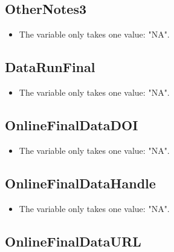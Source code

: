 \documentclass[]{article}
\providecommand{\tightlist}{%
  \setlength{\itemsep}{0pt}\setlength{\parskip}{0pt}}
\newcommand{\fullline}{\noindent\makebox[\linewidth]{\rule{\textwidth}{0.4pt}}}
\begin{document}
\fullline

\hypertarget{othernotes3}{\subsection{OtherNotes3}\label{othernotes3}}

\begin{itemize}
\tightlist
\item
  The variable only takes one value: "NA".
\end{itemize}

\fullline

\hypertarget{datarunfinal}{\subsection{DataRunFinal}\label{datarunfinal}}

\begin{itemize}
\tightlist
\item
  The variable only takes one value: "NA".
\end{itemize}

\fullline

\hypertarget{onlinefinaldatadoi}{\subsection{OnlineFinalDataDOI}\label{onlinefinaldatadoi}}

\begin{itemize}
\tightlist
\item
  The variable only takes one value: "NA".
\end{itemize}

\fullline

\hypertarget{onlinefinaldatahandle}{\subsection{OnlineFinalDataHandle}\label{onlinefinaldatahandle}}

\begin{itemize}
\tightlist
\item
  The variable only takes one value: "NA".
\end{itemize}

\fullline

\hypertarget{onlinefinaldataurl}{\subsection{OnlineFinalDataURL}\label{onlinefinaldataurl}}
\end{document}
